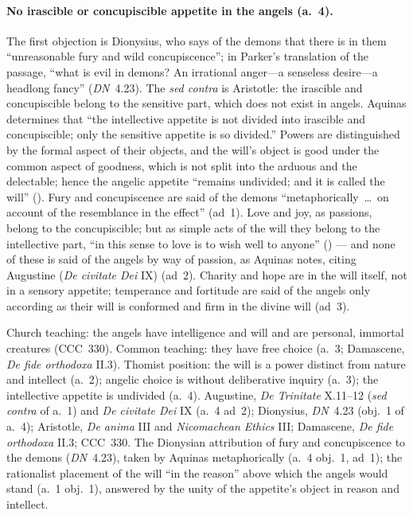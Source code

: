\paragraph{No irascible or concupiscible appetite in the angels (a.~4).}
The first objection is Dionysius, who says of the demons that there is
in them ``unreasonable fury and wild concupiscence''; in Parker's
translation of the passage, ``what is evil in demons? An irrational
anger---a senseless desire---a headlong fancy'' (\emph{DN}~4.23). The
\emph{sed contra} is Aristotle: the irascible and concupiscible belong
to the sensitive part, which does not exist in angels. Aquinas
determines that ``the intellective appetite is not divided into
irascible and concupiscible; only the sensitive appetite is so
divided.'' Powers are distinguished by the formal aspect of their
objects, and the will's object is good under the common aspect of
goodness, which is not split into the arduous and the delectable; hence
the angelic appetite ``remains undivided; and it is called the will''
(). Fury and concupiscence
are said of the demons ``metaphorically~\dots\ on account of the
resemblance in the effect'' (ad~1). Love and joy, as passions, belong to
the concupiscible; but as simple acts of the will they belong to the
intellective part, ``in this sense to love is to wish well to anyone''
() --- and none of these is said of
the angels by way of passion, as Aquinas notes, citing Augustine
(\emph{De civitate Dei} IX) (ad~2). Charity and hope are in the will
itself, not in a sensory appetite; temperance and fortitude are said of
the angels only according as their will is conformed and firm in the
divine will (ad~3).

 {Church teaching: the angels have intelligence and will and are
 personal, immortal creatures (CCC~330). Common teaching: they have free
 choice (a.~3; Damascene, \emph{De fide orthodoxa} II.3). Thomist
 position: the will is a power distinct from nature and intellect (a.~2);
 angelic choice is without deliberative inquiry (a.~3); the intellective
 appetite is undivided (a.~4).}
 {Augustine, \emph{De Trinitate} X.11--12 (\emph{sed contra} of a.~1)
 and \emph{De civitate Dei} IX (a.~4 ad~2); Dionysius, \emph{DN}~4.23
 (obj.~1 of a.~4); Aristotle, \emph{De anima} III and \emph{Nicomachean
 Ethics} III; Damascene, \emph{De fide orthodoxa} II.3; CCC~330.}
 {The Dionysian attribution of fury and concupiscence to the demons
 (\emph{DN}~4.23), taken by Aquinas metaphorically (a.~4 obj.~1, ad~1);
 the rationalist placement of the will ``in the reason'' above which the
 angels would stand (a.~1 obj.~1), answered by the unity of the
 appetite's object in reason and intellect.}

